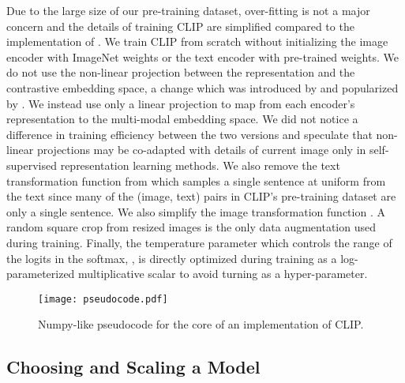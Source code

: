 \documentclass{article}
\begin{document}
Due to the large size of our pre-training dataset, over-fitting is not a major concern and the details of training CLIP are simplified compared to the implementation of \citet{zhang2020contrastive}. We train CLIP from scratch without initializing the image encoder with ImageNet weights or the text encoder with pre-trained weights. We do not use the non-linear projection between the representation and the contrastive embedding space, a change which was introduced by \citet{bachman2019learning} and popularized by \citet{chen2020simple}. We instead use only a linear projection to map from each encoder's representation to the multi-modal embedding space. We did not notice a difference in training efficiency between the two versions and speculate that non-linear projections may be co-adapted with details of current image only in self-supervised representation learning methods. We also remove the text transformation function  from \citet{zhang2020contrastive} which samples a single sentence at uniform from the text since many of the (image, text) pairs in CLIP's pre-training dataset are only a single sentence. We also simplify the image transformation function . A random square crop from resized images is the only data augmentation used during training. Finally, the temperature parameter which controls the range of the logits in the softmax, , is directly optimized during training as a log-parameterized multiplicative scalar to avoid turning as a hyper-parameter.

\begin{figure}[t]
\begin{center}
\centerline{\texttt{[image: pseudocode.pdf]}}
\caption{Numpy-like pseudocode for the core of an implementation of CLIP.}
\label{pseudocode}
\end{center}
\vspace{-1em}
\end{figure}


























\subsection{Choosing and Scaling a Model}
\end{document}
